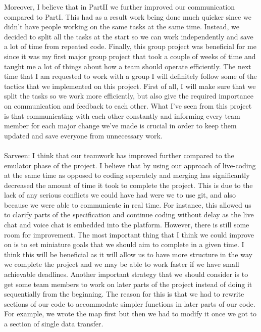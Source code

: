 \documentclass[a4paper]{article}
\begin{document}
Moreover, I believe that in PartII we further improved our communication compared to PartI. This had as a result work being
done much quicker since we didn't have people working on the same tasks at the same time. Instead, 
we decided to split all the tasks at the start so we can work independently and save a lot of time from repeated code.
Finally, this group project was beneficial for me since it was my first major group project that took a couple of weeks of time 
and taught me a lot of things about how a team should operate efficiently. The next time that I am requested to work with a group I will 
definitely follow some of the tactics that we implemented on this project. First of all, I will make sure that we split the tasks 
so we work more efficiently, but also give the required importance on communication and feedback to each other. What I've seen from 
this project is that communicating with each other constantly and informing every team member for each major change we've made 
is crucial in order to keep them updated and save everyone from unnecessary work.
\\ \\
Sarveen: I think that our teamwork has improved further compared to the emulator phase of the project. I believe that
by using our approach of live-coding at the same time as opposed to coding seperately and merging has significantly
decreased the amount of time it took to complete the project. This is due to the lack of any serious conflicts we could
have had were we to use git, and also because we were able to communicate in real time. For instance, this allowed us 
to clarify parts of the specification and continue coding without delay as the live chat and voice chat is embedded
into the platform. However, there is still some room for improvement. The most important thing that I think we could 
improve on is to set miniature goals that we should aim to complete in a given time. I think this will be beneficial 
as it will allow us to have more structure in the way we complete the project and we may be able to work faster if we
have small achievable deadlines. Another important strategy that we should consider is to get some team members to work
on later parts of the project instead of doing it sequentially from the beginning. The reason for this is that we had 
to rewrite sections of our code to accommodate simpler functions in later parts of our code.  For example, we wrote the 
map first but then we had to modify it once we got to a section of single data transfer. 
\end{document}
